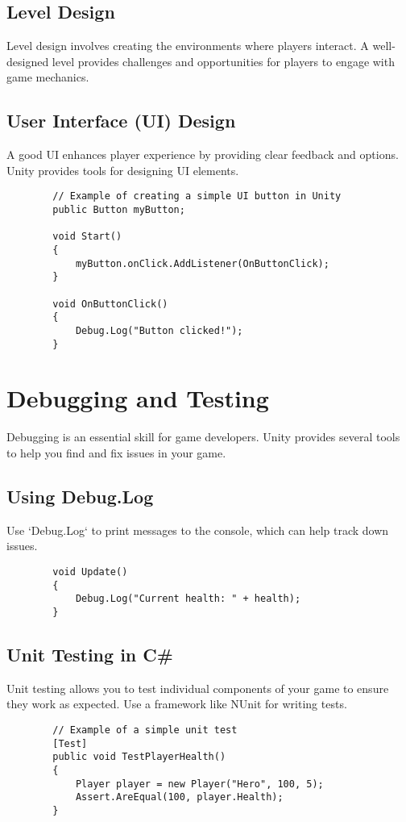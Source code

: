 \documentclass[a4paper,12pt]{book}
\begin{document}
	\section{Level Design}
	Level design involves creating the environments where players interact. A well-designed level provides challenges and opportunities for players to engage with game mechanics.
	
	\section{User Interface (UI) Design}
	A good UI enhances player experience by providing clear feedback and options. Unity provides tools for designing UI elements.
	
	\begin{lstlisting}
		// Example of creating a simple UI button in Unity
		public Button myButton;
		
		void Start()
		{
			myButton.onClick.AddListener(OnButtonClick);
		}
		
		void OnButtonClick()
		{
			Debug.Log("Button clicked!");
		}
	\end{lstlisting}
	
	\chapter{Debugging and Testing}
	Debugging is an essential skill for game developers. Unity provides several tools to help you find and fix issues in your game.
	
	\section{Using Debug.Log}
	Use `Debug.Log` to print messages to the console, which can help track down issues.
	
	\begin{lstlisting}
		void Update()
		{
			Debug.Log("Current health: " + health);
		}
	\end{lstlisting}
	
	\section{Unit Testing in C\#}
	Unit testing allows you to test individual components of your game to ensure they work as expected. Use a framework like NUnit for writing tests.
	
	\begin{lstlisting}
		// Example of a simple unit test
		[Test]
		public void TestPlayerHealth()
		{
			Player player = new Player("Hero", 100, 5);
			Assert.AreEqual(100, player.Health);
		}
	\end{lstlisting}
	
\end{document}
